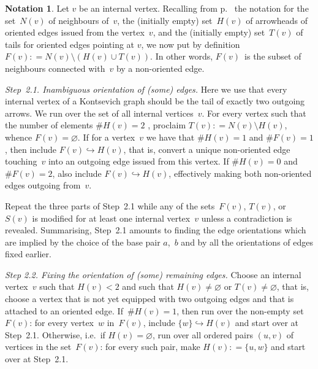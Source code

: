 \documentclass[a4paper]{jpconf}%
\theoremstyle{definition}
\newtheorem*{notation}{Notation}
\theoremstyle{remark}
\begin{document}
\begin{notation}
Let $v$ be an internal vertex. 
Recalling from p.~\pageref{pNotationNHT} the notation for the set~$N(v)$ of neighbours of~$v$, the (initially empty) set~$H(v)$ of arrowheads of oriented edges issued from the vertex~$v$, and the (initially empty) set~$T(v)$ of tails for oriented edges pointing at $v$, we now put by definition
$F(v) \mathrel{{:}{=}} N(v)\setminus (H(v)\cup T(v))$. In other words, $F(v)$~is the subset of neighbours connected with~$v$ by a non\/-\/oriented edge.
\end{notation}

\noindent%
{\textit{Step~2.1. Inambiguous orientation of \textup{(}some\textup{)} edges.}}
Here we use that every internal vertex of a Kontsevich graph should be the tail of %
exactly two outgoing arrows. %
We run %
over the set of all internal vertices~$v$. For every vertex such that 
the number of elements $\# H(v)=2$%
, proclaim $T(v) \mathrel{{:}{=}} N(v)\setminus H(v)$, whence $F(v)=\varnothing$.
If for a vertex~$v$ we have that $\# H(v)=1$ and $\# F(v)=1$, then include $F(v)\hookrightarrow H(v)$, 
that is, convert %
a unique non\/-\/oriented edge touching~$v$ into an outgoing edge 
issued from %
this vertex. %
If $\# H(v)=0$ and $\# F(v)=2$, also include $F(v)\hookrightarrow H(v)$, 
effectively making both non\/-\/oriented edges outgoing from~$v$.

Repeat the three parts of Step~2.1 while any of the sets~$F(v)$, $T(v)$, or%
~$S(v)$
is modified for at least one internal vertex~$v$ unless a contradiction is revealed. 
Summarising, Step~2.1 amounts to finding the edge orientations which are implied by the choice of the base pair $a$,~$b$ and by all the orientations of edges fixed earlier.

\noindent%
{\textit{Step 2.2. Fixing the orientation of \textup{(}some\textup{)} remaining edges.}} 
Choose an internal ver\-tex~$v$ such that $H(v)<2$ and such that $H(v)\neq\varnothing$ or $T(v)\neq\varnothing$, that is, choose a vertex that is not yet equipped with two outgoing edges and that is attached to an oriented edge. %
If~$\# H(v)=1$, then run over the non\/-\/empty set~$F(v)$: for every vertex~$w$ in~$F(v)$, 
include $\{w\}\hookrightarrow H(v)$ and start over at Step~2.1.
Otherwise, i.e.\ if $H(v)=\varnothing$, run over all ordered pairs $(u,v)$ of vertices in the set~$F(v)$: for every such pair, make $H(v) \mathrel{{:}{=}} \{u,w\}$ and start over at Step~2.1.
\end{document}
